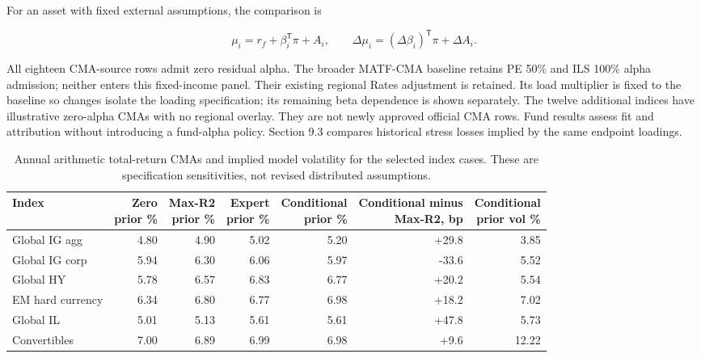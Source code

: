 \documentclass[a4paper,review]{cas-sc}
\begin{document}
For an asset with fixed external assumptions, the comparison is

\begin{equation}
\mu_i=r_f+\beta_i^{\mathsf T}\pi+A_i,\qquad
\Delta\mu_i=(\Delta\beta_i)^{\mathsf T}\pi+\Delta A_i.
\end{equation}

All eighteen CMA-source rows admit zero residual alpha. The broader MATF-CMA baseline retains PE 50\% and ILS 100\% alpha admission; neither enters this fixed-income panel. Their existing regional Rates adjustment is retained. Its load multiplier is fixed to the baseline so changes isolate the loading specification; its remaining beta dependence is shown separately. The twelve additional indices have illustrative zero-alpha CMAs with no regional overlay. They are not newly approved official CMA rows. Fund results assess fit and attribution without introducing a fund-alpha policy. Section 9.3 compares historical stress losses implied by the same endpoint loadings.

\begin{table}[pos=htbp]
\centering
\small
\caption{Annual arithmetic total-return CMAs and implied model volatility for the selected index cases. These are specification sensitivities, not revised distributed assumptions.}
\begin{adjustbox}{max width=\linewidth}
\begin{tabular}{lrrrrrr}
\toprule
Index & \shortstack{Zero\\prior} \% & \shortstack{Max-R2\\prior} \% & \shortstack{Expert\\prior} \% & \shortstack{Conditional\\prior} \% & \shortstack{Conditional minus\\Max-R2, bp} & \shortstack{Conditional\\prior} vol \% \\
\midrule
Global IG agg & 4.80 & 4.90 & 5.02 & 5.20 & +29.8 & 3.85 \\
Global IG corp & 5.94 & 6.30 & 6.06 & 5.97 & -33.6 & 5.52 \\
Global HY & 5.78 & 6.57 & 6.83 & 6.77 & +20.2 & 5.54 \\
EM hard currency & 6.34 & 6.80 & 6.77 & 6.98 & +18.2 & 7.02 \\
Global IL & 5.01 & 5.13 & 5.61 & 5.61 & +47.8 & 5.73 \\
Convertibles & 7.00 & 6.89 & 6.99 & 6.98 & +9.6 & 12.22 \\
\bottomrule
\end{tabular}
\end{adjustbox}
\end{table}
\end{document}
